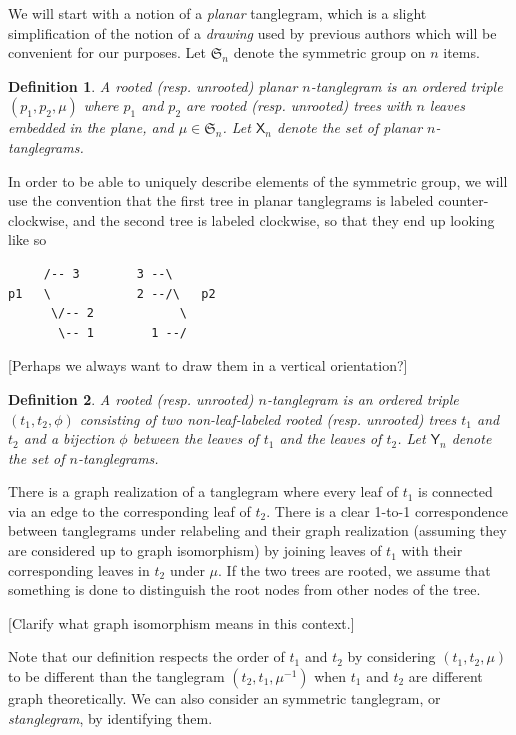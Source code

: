 \documentclass{amsart}
\newtheorem{definition}{Definition}
\newcommand{\fS}{\mathfrak S}
\newcommand{\pairing}{\mu}
\newcommand{\ptangle}{\mathsf{X}}
\newcommand{\tangle}{\mathsf{Y}}
\begin{document}
We will start with a notion of a \emph{planar} tanglegram, which is a slight simplification of the notion of a \emph{drawing} used by previous authors \cite{Venkatachalam2010-zh} which will be convenient for our purposes.
Let $\fS_n$ denote the symmetric group on $n$ items.
\begin{definition}
\label{def:ptanglegram}
A rooted (resp. unrooted) \emph{planar $n$-tanglegram} is an ordered triple $(p_1, p_2, \pairing)$ where $p_1$ and $p_2$ are rooted (resp. unrooted) trees with $n$ leaves embedded in the plane, and $\pairing \in \fS_n$.
Let $\ptangle_n$ denote the set of planar $n$-tanglegrams.
\end{definition}

In order to be able to uniquely describe elements of the symmetric group, we will use the convention that the first tree in planar tanglegrams is labeled counter-clockwise, and the second tree is labeled clockwise, so that they end up looking like so

\begin{verbatim}
     /-- 3        3 --\
p1   \            2 --/\   p2
      \/-- 2            \
       \-- 1        1 --/
\end{verbatim}

[Perhaps we always want to draw them in a vertical orientation?]

\begin{definition}
\label{def:tanglegram}
A rooted (resp. unrooted) $n$-\emph{tanglegram} is an ordered triple $(t_1, t_2, \phi)$ consisting of two non-leaf-labeled rooted (resp. unrooted) trees $t_1$ and $t_2$ and a bijection $\phi$ between the leaves of $t_1$ and the leaves of $t_2$.
Let $\tangle_n$ denote the set of $n$-tanglegrams.
\end{definition}
There is a graph realization of a tanglegram where every leaf of $t_1$ is connected via an edge to the corresponding leaf of $t_2$.
There is a clear 1-to-1 correspondence between tanglegrams under relabeling and their graph realization (assuming they are considered up to graph isomorphism) by joining leaves of $t_1$ with their corresponding leaves in $t_2$ under $\pairing$.
If the two trees are rooted, we assume that something is done to distinguish the root nodes from other nodes of the tree.

[Clarify what graph isomorphism means in this context.]

Note that our definition respects the order of $t_1$ and $t_2$ by considering $(t_1, t_2, \pairing)$ to be different than the tanglegram $(t_2, t_1, \pairing^{-1})$ when $t_1$ and $t_2$ are different graph theoretically.
We can also consider an symmetric tanglegram, or \emph{stanglegram}, by identifying them.
\end{document}
